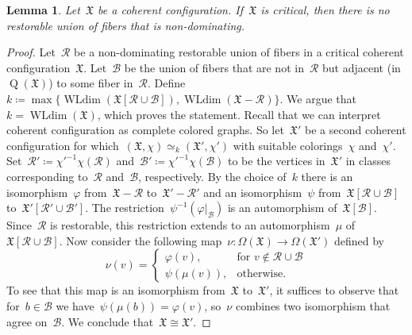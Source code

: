 \documentclass[english,a4paper]{article}
\theoremstyle{plain}
\newtheorem{lemma}      [theorem]{Lemma}
\theoremstyle{definition}
\newcommand{\coherentConfig}{\ensuremath{\mathfrak{X}}}
\newcommand{\vertices}{\ensuremath{\Omega}}
\DeclareMathOperator*{\WLdim}{WLdim}
\newcommand{\wldim}[1]{\ensuremath{\WLdim\left(#1\right)}}
\DeclareMathOperator*{\Quotient}{Q}
\newcommand{\quotientGraph}[1]{\ensuremath{\Quotient(#1)}}
\newcommand{\coloring}{\ensuremath{\chi}}
\begin{document}
\begin{lemma}
\label{critical:restorable/lem}
    Let~$\coherentConfig$ be a coherent configuration.
    If~$\coherentConfig$ is critical, then there is no restorable union of fibers that is non-dominating.
\end{lemma}
\begin{proof}
    Let~$\mathcal{R}$ be a non-dominating restorable union of fibers in a
    critical coherent configuration~$\coherentConfig$. Let~$\mathcal{B}$ be the union of fibers that are not in~$\mathcal{R}$ but adjacent (in~$\quotientGraph{\coherentConfig}$) to some fiber in~$\mathcal{R}$. Define~$k\coloneqq\max \{ \wldim{\coherentConfig[\mathcal{R}\cup \mathcal{B}]},\wldim{\coherentConfig-\mathcal{R}} \}$. We argue that~$k= \wldim{\coherentConfig}$, which proves the statement.
    Recall that we can interpret coherent configuration as complete colored graphs.
    So let~$\coherentConfig'$ be a second coherent configuration for which~$(\coherentConfig,\chi)\simeq_k (\coherentConfig',\chi')$ with suitable colorings~$\chi$ and~$\chi'$. Set~$\mathcal{R}'\coloneqq\coloring'^{-1}{\coloring(\mathcal{R})}$
    and~$\mathcal{B}'\coloneqq\coloring'^{-1}{\coloring(\mathcal{B})}$ to be the vertices in~$\coherentConfig'$ in classes corresponding to~$\mathcal{R}$ and~$\mathcal{B}$, respectively.
    By the choice of~$k$ there is an isomorphism~$\varphi$ from~$\coherentConfig-\mathcal{R}$ to~$\coherentConfig'-\mathcal{R}'$ and an isomorphism~$\psi$ from~$\coherentConfig[\mathcal{R}\cup \mathcal{B}]$ to~$\coherentConfig'[\mathcal{R}'\cup \mathcal{B}']$.
    The restriction~$\psi^{-1}(\varphi|_{\mathcal{B}})$ is an automorphism of~$\coherentConfig[\mathcal{B}]$. Since~$\mathcal{R}$ is restorable, this restriction extends to an automorphism~$\mu$ of~$ \coherentConfig[\mathcal{R}\cup \mathcal{B}]$.
    Now consider the following map~$\nu\colon \vertices(\coherentConfig)\rightarrow \vertices(\coherentConfig')$ defined by
    \[
        \nu (v) =
        \begin{cases}
                \varphi(v),   & \text{for~$v\notin \mathcal{R}\cup \mathcal{B}$}\\
                \psi(\mu(v)), & \text{otherwise.}
        \end{cases}
    \]
    To see that this map is an isomorphism from~$\coherentConfig$ to~$\coherentConfig'$, it suffices to observe that for~$b\in \mathcal{B}$ we have~$\psi(\mu(b))= \varphi(v)$, so~$\nu$ combines two isomorphism that agree on~$\mathcal{B}$. We conclude that~$\coherentConfig\cong \coherentConfig'$.
\end{proof}
\end{document}
